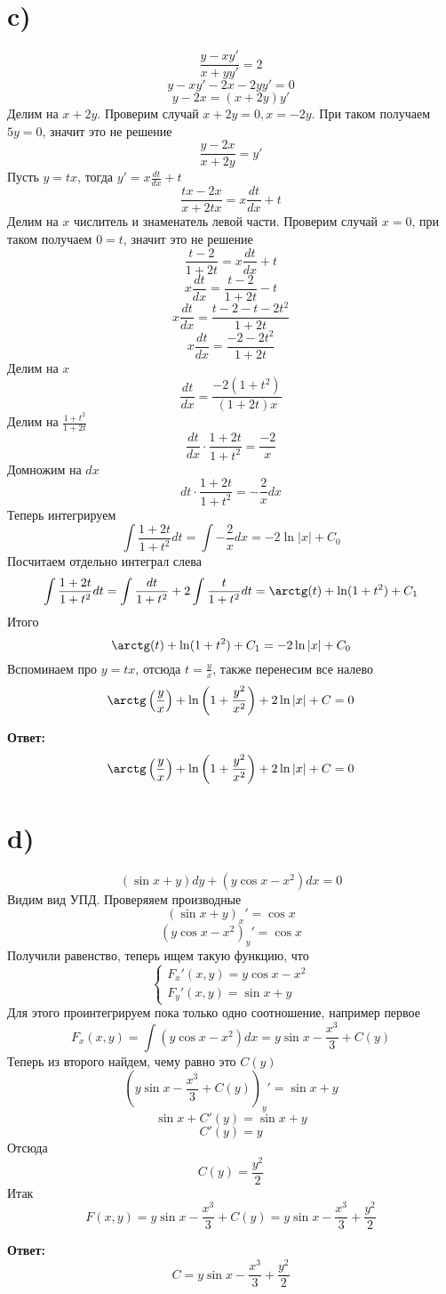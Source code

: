 \documentclass[a4paper,12pt]{article}
\begin{document}
\section*{c)}
\[
\frac{y - xy'}{x + yy'} = 2
\]
\[
y - xy' - 2x - 2yy' = 0
\]
\[
y - 2x = (x + 2y)y'
\]
Делим на $x + 2y$. Проверим случай $x + 2y = 0, x = -2y$. При таком получаем $5y = 0$, значит это не решение
\[
\frac{y - 2x}{x + 2y} = y'
\]
Пусть $y = tx$, тогда $y'= x \frac{dt}{dx} + t$
\[
\frac{tx - 2x}{x + 2tx} = x \frac{dt}{dx} + t
\]
Делим на $x$ числитель и знаменатель левой части. Проверим случай $x = 0$, при таком получаем $0 = t$, значит это не решение
\[
\frac{t - 2}{1 + 2t} = x \frac{dt}{dx} + t
\]
\[
x \frac{dt}{dx} = \frac{t - 2}{1 + 2t}  - t
\]
\[
x \frac{dt}{dx} = \frac{t - 2 - t - 2t^2}{1 + 2t}  
\]
\[
x \frac{dt}{dx} = \frac{- 2 - 2t^2}{1 + 2t}  
\]
Делим на $x$
\[
\frac{dt}{dx} = \frac{- 2 (1+ t^2)}{(1 + 2t)x}  
\]
Делим на $\frac{1+t^2}{1+2t}$
\[
\frac{dt}{dx} \cdot \frac{1+2t}{1+t^2} = \frac{-2}{x}
\]
Домножим на $dx$
\[
dt \cdot \frac{1 + 2t}{1 + t^2} = -\frac{2}{x} dx
\]
Теперь интегрируем
\[
\int \frac{1 + 2t}{1 + t^2}  dt = \int -\frac{2}{x} dx = - 2 \ln |x| + C_0
\]
Посчитаем отдельно интеграл слева
\[
\int \frac{1 + 2t}{1 + t^2}  dt = \int \frac{dt}{1 +t^2} + 2\int \frac{t}{1 + t^2} dt =\arctg(t) +  \ln (1 + t^2) + C_1
\]
Итого
\[
\arctg(t) + \ln (1 + t^2) + C_1 = - 2 \ln |x| + C_0
\]
Вспоминаем про $y = tx$, отсюда $t = \frac{y}{x}$, также перенесим все налево
\[
\arctg\left(\frac{y}{x}\right) + \ln \left( 1 + \frac{y^2}{x^2} \right) + 2 \ln |x| + C = 0
\]
\begin{center}
\textbf{Ответ: } 
\[
\arctg\left(\frac{y}{x}\right) + \ln \left( 1 + \frac{y^2}{x^2}\right)  + 2 \ln |x| + C = 0
\]
\end{center}
\clearpage
\section*{d)}
\[
(\sin x + y)dy + (y \cos x - x^2) dx = 0
\]
Видим вид УПД. Проверяяем производные
\[
\left( \sin x + y \right)_x' = \cos x
\]
\[
\left( y \cos x - x^2 \right)_y' =  \cos x
\]
Получили равенство, теперь ищем такую функцию, что
\[
\begin{cases}
F_x'(x, y) = y \cos x - x^2 \\
F_y'(x, y) = \sin x + y 
\end{cases}
\]
Для этого проинтегрируем пока только одно соотношение, например первое
\[
F_x(x, y) = \int (y \cos x - x^2 )dx = y \sin x - \frac{x^3}{3} + C(y)
\]
Теперь из второго найдем, чему равно это $C(y)$
\[
\left( y \sin x - \frac{x^3}{3} + C(y) \right)_y'= \sin x + y
\]
\[
\sin x + C'(y)  = \sin x + y
\]
\[
C'(y) = y
\]
Отсюда
\[
C(y) = \frac{y^2}{2}
\]
Итак
\[
F(x, y) = y \sin x - \frac{x^3}{3} + C(y) = y \sin x - \frac{x^3}{3} + \frac{y^2}{2}
\]
\begin{center}
\textbf{Ответ: } 
\[
C =  y \sin x - \frac{x^3}{3} + \frac{y^2}{2}
\]
\end{center}
\clearpage
\end{document}
